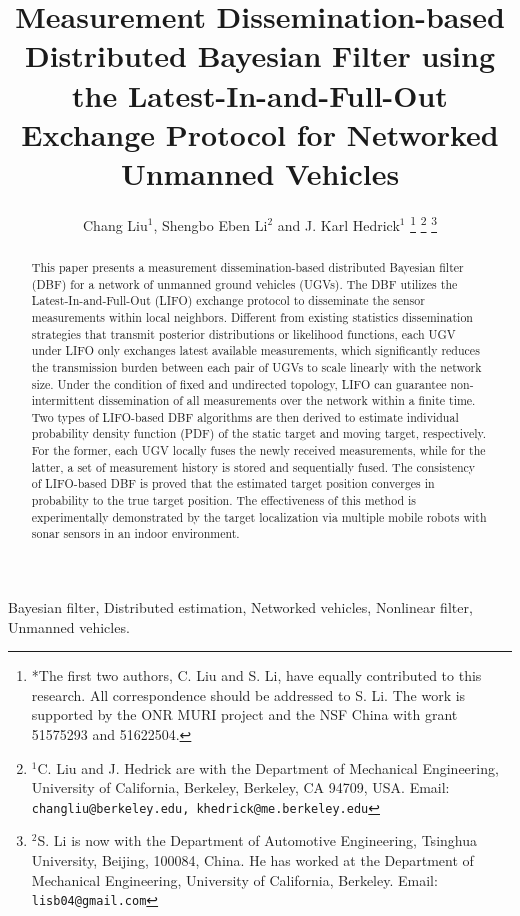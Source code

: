 \documentclass[journal]{IEEEtranTIE}
\title{\LARGE \bf
	Measurement Dissemination-based Distributed Bayesian Filter using the Latest-In-and-Full-Out Exchange Protocol for Networked Unmanned Vehicles}
\author{Chang Liu$^{1}$, Shengbo Eben Li$^{2}$ and J. Karl Hedrick$^{1}$%
	\thanks{*The first two authors, C. Liu and S. Li, have equally contributed to this research. All correspondence should be addressed to S. Li. The work is supported by the ONR MURI project and the NSF China with grant 51575293 and 51622504.
	}%
	\thanks{$^{1}$C. Liu and J. Hedrick are with the Department of Mechanical Engineering, University of California, Berkeley, Berkeley, CA 94709, USA. Email: {\tt\small changliu@berkeley.edu, khedrick@me.berkeley.edu}}%
	\thanks{$^{2}$S. Li is now with the Department of Automotive Engineering, Tsinghua University, Beijing, 100084, China. He has worked at the Department of Mechanical Engineering, University of California, Berkeley. Email: {\tt\small lisb04@gmail.com}}
}
\theoremstyle{remark}
\newcommand{\todopara}[1]{\vspace{0px} %
	\todo[inline, color=black!10]{\textbf{[Paragraph:]} {#1}} %
}
\newcommand{\todonote}[1]{\vspace{0px} %
	\todo[inline, color=green!30]{\textbf{[Note:]} {#1}} %
}
\newcommand{\todoQ}[1]{\vspace{0px} %
	\todo[inline, color=orange!50]{\textbf{[Note:]} {#1}} %
}
\newcommand{\todohere}[1]{\hl{(\textbf{TODO:} #1)}}
\newcommand{\hidetodos}{
	\renewcommand{\todopara}[1]{}
	\renewcommand{\todonote}[1]{}
	\renewcommand{\todoQ}[1]{}
	\renewcommand{\todohere}[1]{}
}
\begin{document}
	
	
	\maketitle
	\thispagestyle{empty}
	\pagestyle{empty}
	
	
	\begin{abstract}
		This paper presents a measurement dissemination-based distributed Bayesian filter (DBF) for a network of unmanned ground vehicles (UGVs).
		The DBF utilizes the Latest-In-and-Full-Out (LIFO) exchange protocol to disseminate the sensor measurements within local neighbors.
		Different from existing statistics dissemination strategies that transmit posterior distributions or likelihood functions, each UGV under LIFO only exchanges
		latest available measurements,
		which significantly reduces the transmission burden between each pair of UGVs to scale linearly with the network size.
		Under the condition of fixed and undirected topology, LIFO can guarantee non-intermittent dissemination of all measurements over the network within a finite time.
		Two types of LIFO-based DBF algorithms are then derived to estimate individual probability density function (PDF) of the static target and moving target, respectively. 
		For the former, each UGV locally fuses the newly received measurements, while for the latter, a set of measurement history is stored and sequentially fused. 
		The consistency of LIFO-based DBF is proved that the estimated target position converges in probability to the true target position.
		The effectiveness of this method is experimentally demonstrated by the target localization via multiple mobile robots with sonar sensors in an indoor environment.
	\end{abstract}
	
	\begin{IEEEkeywords}
		Bayesian filter, Distributed estimation, Networked vehicles, Nonlinear filter, Unmanned vehicles.
	\end{IEEEkeywords}
\end{document}
